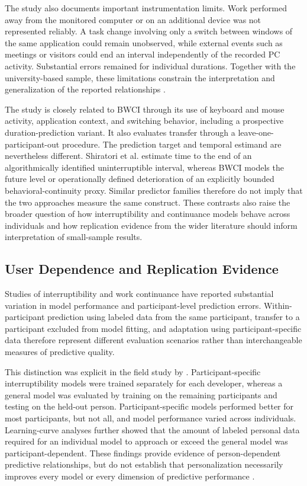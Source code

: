 The study also documents important instrumentation limits. Work performed away from the monitored computer or on an additional device was not represented reliably. A task change involving only a switch between windows of the same application could remain unobserved, while external events such as meetings or visitors could end an interval independently of the recorded PC activity. Substantial errors remained for individual durations. Together with the university-based sample, these limitations constrain the interpretation and generalization of the reported relationships \parencite{shiratori2020workContinuance}.

The study is closely related to BWCI through its use of keyboard and mouse activity, application context, and switching behavior, including a prospective duration-prediction variant. It also evaluates transfer through a leave-one-participant-out procedure. The prediction target and temporal estimand are nevertheless different. Shiratori et al. estimate time to the end of an algorithmically identified uninterruptible interval, whereas BWCI models the future level or operationally defined deterioration of an explicitly bounded behavioral-continuity proxy. Similar predictor families therefore do not imply that the two approaches measure the same construct. These contrasts also raise the broader question of how interruptibility and continuance models behave across individuals and how replication evidence from the wider literature should inform interpretation of small-sample results.

\subsection{User Dependence and Replication Evidence}
Studies of interruptibility and work continuance have reported substantial variation in model performance and participant-level prediction errors. Within-participant prediction using labeled data from the same participant, transfer to a participant excluded from model fitting, and adaptation using participant-specific data therefore represent different evaluation scenarios rather than interchangeable measures of predictive quality. 

This distinction was explicit in the field study by \textcite{zueger2018sensing}. Participant-specific interruptibility models were trained separately for each developer, whereas a general model was evaluated by training on the remaining participants and testing on the held-out person. Participant-specific models performed better for most participants, but not all, and model performance varied across individuals. Learning-curve analyses further showed that the amount of labeled personal data required for an individual model to approach or exceed the general model was participant-dependent. These findings provide evidence of person-dependent predictive relationships, but do not establish that personalization necessarily improves every model or every dimension of predictive performance \parencite{zueger2018sensing}.

